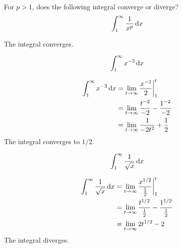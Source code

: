 \begin{ex}
    For $p>1$, does the following integral converge or diverge?
    \[ \int^\infty_1 \frac{1}{x^p} \,\mathrm{d} x \]
    \begin{sol}
      The integral converges.
    \end{sol}
  \end{ex}
\begin{ex}
	\[ \int^{\infty}_1 x^{-3} \,\mathrm{d} x \]
	\begin{sol}
	\begin{align*}
		\int^{\infty}_1 x^{-3} \,\mathrm{d} x &=\lim_{t \to \infty} \frac{x^{-2}}{2}\bigg|^{t}_{1} \\
		  &=\lim_{t \to \infty} \frac{t^{-2}}{-2}-\frac{1^{-2}}{-2} \\
		  &=\lim_{t \to \infty} \frac{1}{-2t^2}+\frac{1}{2}
	\end{align*}
The integral converges to $1/2$.
\end{sol}
\end{ex}
\begin{ex}
	\[ \int^\infty_1 \frac{1}{\sqrt{x}}\,\mathrm{d} x \]
	\begin{sol}
	\begin{align*}
		\int^\infty_1 \frac{1}{\sqrt{x}}\,\mathrm{d} x &=\lim_{t \to \infty} \frac{x^{1/2}}{\frac{1}{2}}\bigg|^t_1 \\
		&=\lim_{t \to \infty} \frac{t^{1/2}}{\frac{1}{2}}-\frac{1^{1/2}}{\frac{1}{2}} \\
		&=\lim_{t \to \infty} 2t^{1/2}-2
	\end{align*}
The integral diverges.
\end{sol}
\end{ex}
